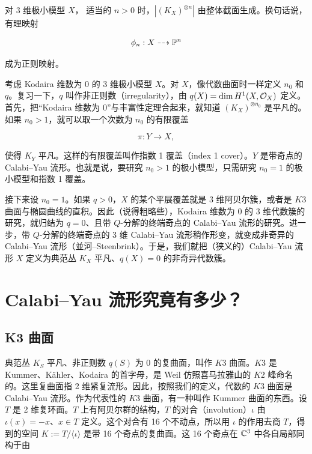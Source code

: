 
对 3 维极小模型 $X$，
适当的 $n>0$ 时，$|(K_X)^{\otimes n}|$ 由整体截面生成。换句话说，有理映射

\[
  \phi_n : X \dashrightarrow \mathbb{P}^n
\]

成为正则映射。

考虑 Kodaira 维数为 0 的 3 维极小模型 $X$。对 $X$，像代数曲面时一样定义 $n_0$ 和 $q$。复习一下，$q$ 叫作非正则数（irregularity），由 $q(X) = \dim H^1(X,\mathcal{O}_X)$ 定义。首先，把“Kodaira 维数为 0”与丰富性定理合起来，就知道 $(K_X)^{\otimes n_0}$ 是平凡的。如果 $n_0 > 1$，就可以取一个次数为 $n_0$ 的有限覆盖

\[
  \pi : Y \longrightarrow X,
\]

使得 $K_Y$ 平凡。这样的有限覆盖叫作指数 1 覆盖（index 1 cover）。$Y$ 是带奇点的 Calabi--Yau 流形。也就是说，要研究 $n_0 > 1$ 的极小模型，只需研究 $n_0 = 1$ 的极小模型和指数 1 覆盖。

接下来设 $n_0 = 1$。如果 $q > 0$，$X$ 的某个平展覆盖就是 3 维阿贝尔簇，或者是 $K3$ 曲面与椭圆曲线的直积。因此（说得粗略些），Kodaira 维数为 0 的 3 维代数簇的研究，就归结为 $q = 0$、且带 $Q$-分解的终端奇点的 Calabi--Yau 流形的研究。进一步，带 $Q$-分解的终端奇点的 3 维 Calabi--Yau 流形稍作形变，就变成非奇异的 Calabi--Yau 流形（並河--Steenbrink）。于是，我们就把（狭义的）Calabi--Yau 流形 $X$ 定义为典范丛 $K_X$ 平凡、$q(X) = 0$ 的非奇异代数簇。

\section{Calabi--Yau 流形究竟有多少？}

\subsection*{K3 曲面}

典范丛 $K_S$ 平凡、非正则数 $q(S)$ 为 0 的复曲面，叫作 $K3$ 曲面。$K3$ 是 Kummer、Kähler、Kodaira 的首字母，是 Weil 仿照喜马拉雅山的 $K2$ 峰命名的。这里复曲面指 2 维紧复流形。因此，按照我们的定义，代数的 $K3$ 曲面是 Calabi--Yau 流形。作为代表性的 $K3$ 曲面，有一种叫作 Kummer 曲面的东西。设 $T$ 是
2 维复环面。$T$ 上有阿贝尔群的结构，$T$ 的对合（involution）$\iota$ 由 $\iota(x) = -x$、$x \in T$ 定义。这个对合有 16 个不动点，所以用 $\iota$ 的作用去商 $T$，得到的空间 $K := T/\langle \iota \rangle$ 是带 16 个奇点的复曲面。这 16 个奇点在 $\mathbb{C}^3$ 中各自局部同构于由

